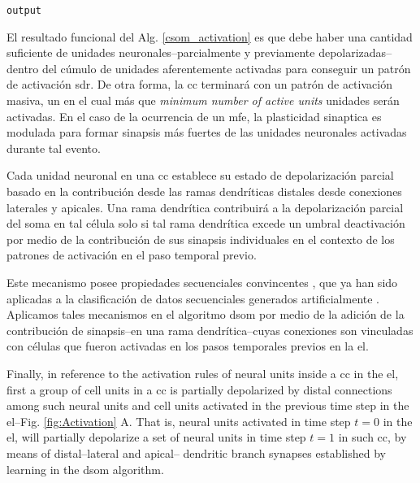 {\begin{algorithm}
\begin{algorithmic}[1]
	\ENDIF

	\ENDFOR

	\RETURN \texttt{output}
\end{algorithmic}
\end{algorithm}

El resultado funcional del Alg. \ref{csom_activation} es que debe haber una cantidad suficiente de unidades neuronales--parcialmente y previamente depolarizadas--dentro del cúmulo de unidades aferentemente activadas para conseguir un patrón de activación \gls{sdr}. De otra forma, la \gls{cc} terminará con un patrón de activación masiva, un  en el cual más que \emph{minimum number of active units} unidades serán activadas.
En el caso de la ocurrencia de un \gls{mfe}, la plasticidad sinaptica es modulada para formar sinapsis más fuertes de las unidades neuronales activadas durante tal evento.

Cada unidad neuronal en una \gls{cc} establece su estado de depolarización parcial basado en la contribución desde
las ramas dendríticas distales desde conexiones laterales y apicales.
Una rama dendrítica contribuirá a la depolarización parcial del soma en tal célula solo si tal
rama dendrítica excede un umbral deactivación por medio de la contribución de sus sinapsis individuales
en el contexto de los patrones de activación en el paso temporal previo.

Este mecanismo posee propiedades secuenciales convincentes \cite{hawkins_2016},
que ya han sido aplicadas a la clasificación de datos secuenciales generados artificialmente \cite{cui_2016}.
Aplicamos tales mecanismos en el algoritmo \gls{dsom} por medio de la adición de la contribución de sinapsis--en una rama dendrítica--cuyas conexiones
son vinculadas con células que fueron activadas en los pasos temporales previos en la \gls{el}.
}{
Finally, in reference to the activation rules of neural units inside a \gls{cc} in the \gls{el},
first a group of cell units in a \gls{cc} is partially depolarized 
by distal connections among such neural units and cell units activated in the
previous time step in the \gls{el}--Fig. \ref{fig:Activation} A.
That is, neural units activated in time step $t=0$ in the \gls{el}, will partially depolarize
a set of neural units in time step $t=1$ in such \gls{cc}, by means of distal--lateral and apical--
dendritic branch synapses established by learning in the \gls{dsom} algorithm.

}
